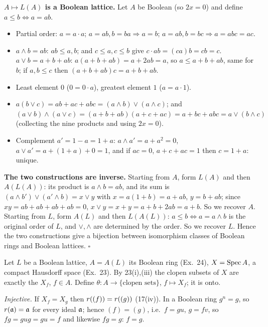 \documentclass[11pt]{article}
\begin{document}
\textbf{$A\mapsto L(A)$ is a Boolean lattice.} Let $A$ be Boolean (so $2x=0$) and define $a\le b\iff a=ab$.
\begin{itemize}[leftmargin=*]
\item Partial order: $a=a\cdot a$; $a=ab,b=ba\Rightarrow a=b$; $a=ab,b=bc\Rightarrow a=abc=ac$.
\item $a\wedge b=ab$: $ab\le a,b$; and $c\le a,c\le b$ give $c\cdot ab=(ca)b=cb=c$. $a\vee b=a+b+ab$: $a(a+b+ab)=a+2ab=a$, so $a\le a+b+ab$, same for $b$; if $a,b\le c$ then $(a+b+ab)c=a+b+ab$.
\item Least element $0$ ($0=0\cdot a$), greatest element $1$ ($a=a\cdot1$).
\item $a(b\vee c)=ab+ac+abc=(a\wedge b)\vee(a\wedge c)$; and $(a\vee b)\wedge(a\vee c)=(a+b+ab)(a+c+ac)=a+bc+abc=a\vee(b\wedge c)$ (collecting the nine products and using $2x=0$).
\item Complement $a'=1-a=1+a$: $a\wedge a'=a+a^2=0$, $a\vee a'=a+(1+a)+0=1$, and if $ac=0$, $a+c+ac=1$ then $c=1+a$: unique.
\end{itemize}

\textbf{The two constructions are inverse.} Starting from $A$, form $L(A)$ and then $A(L(A))$: its product is $a\wedge b=ab$, and its sum is $(a\wedge b')\vee(a'\wedge b)=x\vee y$ with $x=a(1+b)=a+ab$, $y=b+ab$; since $xy=a b+ab+ab+ab=0$, $x\vee y=x+y=a+b+2ab=a+b$. So we recover $A$. Starting from $L$, form $A(L)$ and then $L(A(L))$: $a\le b\iff a=a\wedge b$ is the original order of $L$, and $\vee,\wedge$ are determined by the order. So we recover $L$. Hence the two constructions give a bijection between isomorphism classes of Boolean rings and Boolean lattices. \hfill$\square$

\pf
Let $L$ be a Boolean lattice, $A=A(L)$ its Boolean ring (Ex.~24), $X=\operatorname{Spec} A$, a compact Hausdorff space (Ex.~23). By 23(i),(iii) the clopen subsets of $X$ are exactly the $X_f$, $f\in A$. Define $\theta:A\to\{\text{clopen sets}\}$, $f\mapsto X_f$; it is onto.

\emph{Injective.} If $X_f=X_g$ then $r((f))=r((g))$ (17(iv)). In a Boolean ring $g^n=g$, so $r(\mathfrak a)=\mathfrak a$ for every ideal $\mathfrak a$; hence $(f)=(g)$, i.e.\ $f=gu$, $g=fv$, so $fg=gug=gu=f$ and likewise $fg=g$: $f=g$.
\end{document}
